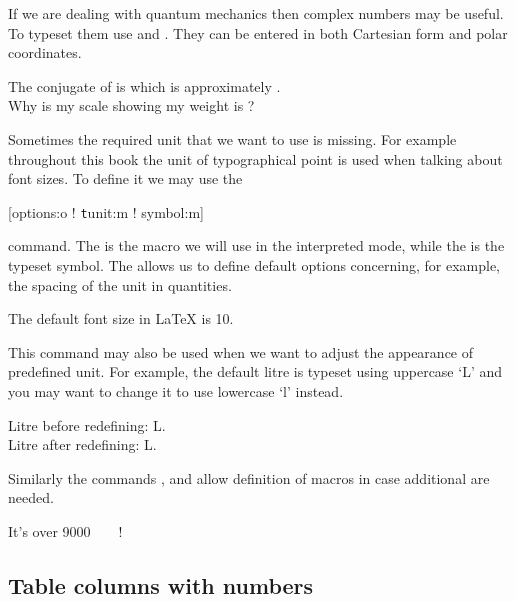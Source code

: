 If we are dealing with quantum mechanics then complex numbers may be useful.
To typeset them use  and . They can be entered in
both Cartesian form and polar coordinates.

\begin{example}[examplewidth=0.4\linewidth]
The conjugate of  is
 which is approximately
. \\
Why is my scale showing my
weight is ?
\end{example}

Sometimes the required unit that we want to use is missing. For example
throughout this book the unit of typographical point is used when talking about
font sizes. To define it we may use the
\begin{lscommand}
  [options:o ! \texttt{t}unit:m ! symbol:m]
\end{lscommand}
command. The  is the macro we will use in the interpreted mode,
while the  is the typeset symbol. The  allows us to
define default options concerning, for example, the spacing of the unit in
quantities.
\begin{example}
The default font size
in \LaTeX{} is \qty{10}{\pt}.
\end{example}

This command may also be used when we want to adjust the appearance of
predefined unit. For example, the default litre is typeset using uppercase
\enquote*{L} and you may want to change it to use lowercase \enquote*{l}
instead.
\begin{example}[examplewidth=0.4\linewidth]
Litre before redefining: \unit{\L}. \\
Litre after redefining: \unit{\L}.
\end{example}

Similarly the commands ,  and
 allow definition of macros in case additional are
needed.
\begin{example}[examplewidth=0.4\linewidth]
\DeclareSIPower\quartic{}
\DeclareSIPrefix{}
\DeclareSIQualifier{}

It's over \qty{9000}{\quartic\decakilo\pt\polymer}!
\end{example}

\subsection{Table columns with numbers} \label{sec:sitables} 

